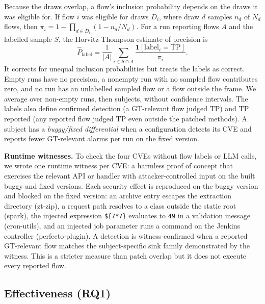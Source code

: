\documentclass[sigconf]{acmart}
\begin{document}
Because the draws overlap, a flow's inclusion probability depends on the draws it was eligible for. If flow $i$ was eligible for draws $D_i$, where draw $d$ samples $n_d$ of $N_d$ flows, then $\pi_i=1-\prod_{d\in D_i}(1-n_d/N_d)$. For a run reporting flows $A$ and the labelled sample $S$, the Horvitz-Thompson estimate of precision is
\[
 \widehat P_{\mathrm{label}}=\frac{1}{|A|}\sum_{i\in S\cap A}\frac{\mathbf{1}[\mathrm{label}_i=\mathrm{TP}]}{\pi_i}.
\]
It corrects for unequal inclusion probabilities but treats the labels as correct. Empty runs have no precision, a nonempty run with no sampled flow contributes zero, and no run has an unlabelled sampled flow or a flow outside the frame. We average over non-empty runs, then subjects, without confidence intervals. The labels also define confirmed detection (a GT-relevant flow judged TP) and TP reported (any reported flow judged TP even outside the patched methods). A subject has a \emph{buggy/fixed differential} when a configuration detects its CVE and reports fewer GT-relevant alarms per run on the fixed version.

\textbf{Runtime witnesses.} To check the four CVEs without flow labels or LLM calls, we wrote one runtime witness per CVE: a harmless proof of concept that exercises the relevant API or handler with attacker-controlled input on the built buggy and fixed versions. Each security effect is reproduced on the buggy version and blocked on the fixed version: an archive entry escapes the extraction directory (zt-zip), a request path resolves to a class outside the static root (spark), the injected expression \texttt{\$\{7*7\}} evaluates to \texttt{49} in a validation message (cron-utils), and an injected job parameter runs a command on the Jenkins controller (perfecto-plugin). A detection is witness-confirmed when a reported GT-relevant flow matches the subject-specific sink family demonstrated by the witness. This is a stricter measure than patch overlap but it does not execute every reported flow.

\subsection{Effectiveness (RQ1)}
\begin{table}[t]
\caption{Buggy-version results on the 4 subjects. B1 and B2 run once; LLM configurations run three
times to measure variation across runs. Det.: CVEs flagged in any run; Rate: percentage of runs reporting a
GT-relevant flow, averaged across subjects; FDR and F1: automatic patch-method metrics. Conf.: subjects with a GT-relevant flow judged TP; TP: subjects with any reported flow judged TP; Prec.: estimated precision, averaged over non-empty runs, then subjects. The labels are not human-verified. Alarms: reported flows per run, summed over subjects.}
\label{tab:headline}
\small\setlength{\tabcolsep}{3.4pt}

\end{table}
\end{document}
